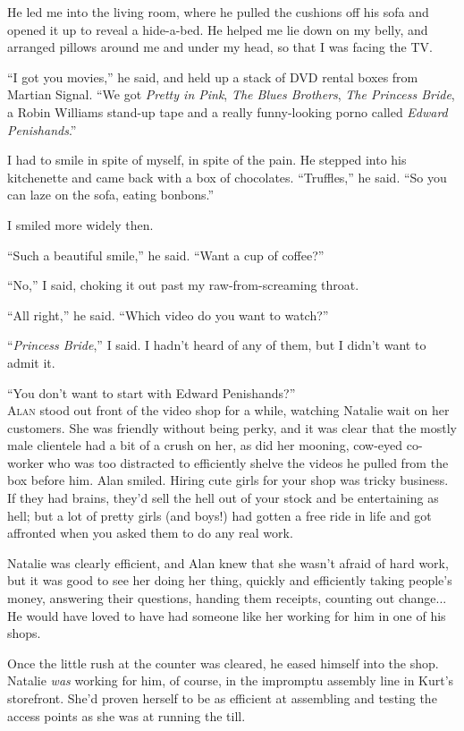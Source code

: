 He led me into the living room, where he pulled the cushions off his
sofa and opened it up to reveal a hide-a-bed.  He helped me lie down
on my belly, and arranged pillows around me and under my head, so that
I was facing the TV.

``I got you movies,'' he said, and held up a stack of DVD rental boxes
from Martian Signal.  ``We got \textit{Pretty in Pink}, \textit{The
Blues Brothers}, \textit{The Princess Bride}, a Robin Williams
stand-up tape and a really funny-looking porno called \textit{Edward
Penishands}.''

I had to smile in spite of myself, in spite of the pain.  He stepped
into his kitchenette and came back with a box of chocolates. 
``Truffles,'' he said.  ``So you can laze on the sofa, eating
bonbons.''

I smiled more widely then.

``Such a beautiful smile,'' he said.  ``Want a cup of coffee?''

``No,'' I said, choking it out past my raw-from-screaming throat.

``All right,'' he said.  ``Which video do you want to watch?''

``\textit{Princess Bride},'' I said.  I hadn't heard of any of them,
but I didn't want to admit it.

``You don't want to start with Edward Penishands?''
\\
\lettrine[lines=3, lhang=.5, nindent=0pt, findent=2pt]{A}{lan} stood out front of the video shop for a while, watching Natalie
wait on her customers.  She was friendly without being perky, and it
was clear that the mostly male clientele had a bit of a crush on her,
as did her mooning, cow-eyed co-worker who was too distracted to
efficiently shelve the videos he pulled from the box before him.  Alan
smiled.  Hiring cute girls for your shop was tricky business.  If they
had brains, they'd sell the hell out of your stock and be entertaining
as hell; but a lot of pretty girls (and boys!) had gotten a free ride
in life and got affronted when you asked them to do any real work.

Natalie was clearly efficient, and Alan knew that she wasn't afraid of
hard work, but it was good to see her doing her thing, quickly and
efficiently taking people's money, answering their questions, handing
them receipts, counting out change...  He would have loved to have had
someone like her working for him in one of his shops.

Once the little rush at the counter was cleared, he eased himself into
the shop.  Natalie \textit{was} working for him, of course, in the
impromptu assembly line in Kurt's storefront.  She'd proven herself to
be as efficient at assembling and testing the access points as she was
at running the till.

